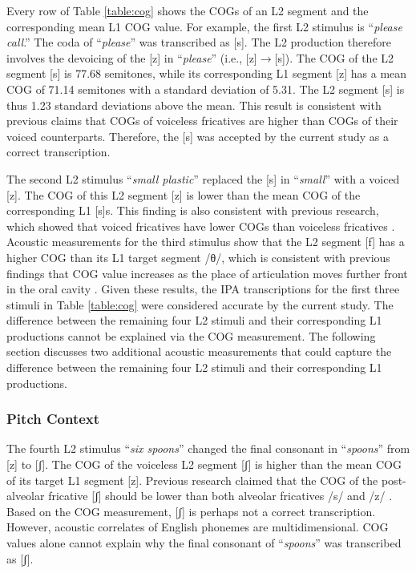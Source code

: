 Every row of Table \ref{table:cog} shows the COGs of an L2 segment and the corresponding mean L1 COG value. For example, the first L2 stimulus is “\textit{please call}.” The coda of “\textit{please}” was transcribed as [s]. The L2 production therefore involves the devoicing of the [z] in “\textit{please}” (i.e., [z]$\rightarrow$[s]). The COG of the L2 segment [s] is 77.68 semitones, while its corresponding L1 segment [z] has a mean COG of 71.14 semitones with a standard deviation of 5.31. The L2 segment [s] is thus 1.23 standard deviations above the mean. This result is consistent with previous claims that COGs of voiceless fricatives are higher than COGs of their voiced counterparts. Therefore, the [s] was accepted by the current study as a correct transcription.

The second L2 stimulus “\textit{small plastic}” replaced the [s] in “\textit{small}” with a voiced [z]. The COG of this L2 segment [z] is lower than the mean COG of the corresponding L1 [s]s. This finding is also consistent with previous research, which showed that voiced fricatives have lower COGs than voiceless fricatives \citep{Jongman_2000}. Acoustic measurements for the third stimulus  show that the L2 segment [f] has a higher COG than its L1 target segment /θ/, which is consistent with previous findings that COG value increases as the place of articulation moves further front in the oral cavity \citep{Jongman_2000}. Given these results, the IPA transcriptions for the first three stimuli in Table \ref{table:cog} were considered accurate by the current study. The difference between the remaining four L2 stimuli and their corresponding L1 productions cannot be explained via the COG measurement. The following section discusses two additional acoustic measurements that could capture the difference between the remaining four L2 stimuli and their corresponding L1 productions.  

\subsubsection{Pitch Context}

The fourth L2 stimulus “\textit{six spoons}” changed the final consonant in “\textit{spoons}” from [z] to [ʃ]. The COG of the voiceless L2 segment [ʃ] is higher than the mean COG of its target L1 segment [z]. Previous research claimed that the COG of the post-alveolar fricative [ʃ] should be lower than both alveolar fricatives /s/ and /z/ \citep{Jongman_2000}. Based on the COG measurement, [ʃ] is perhaps not a correct transcription. However, acoustic correlates of English phonemes are multidimensional. COG values alone cannot explain why the final consonant of “\textit{spoons}” was transcribed as [ʃ]. 

